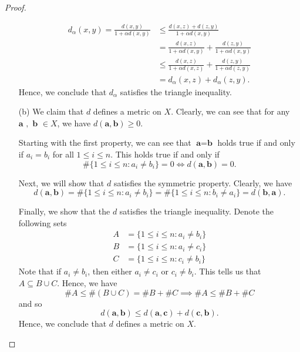 \documentclass[a4paper]{article}
\begin{document}
\begin{proof}
\begin{enumerate}
        \begin{align*}
            {d}_{\alpha}(x,y) = \frac{ d(x,y)  }{  1 + \alpha d(x,y) } &\leq \frac{ d(x,z) + d(z,y) }{ 1 + \alpha d(x,y) }    \\
                                                                       &= \frac{ d(x,z) }{  1 + \alpha d(x,y) } + \frac{ d(z,y) }{  1 + \alpha d(x,y) } \\
                                                                       &\leq \frac{ d(x,z) }{  1 + \alpha d(x,z) }  + \frac{ d(z,y)  }{  1 + \alpha d(z,y) } \\
                                                                       &= {d}_{\alpha}(x,z) + {d}_{\alpha}(z,y).
        \end{align*} 
Hence, we conclude that \( {d}_{\alpha}  \) satisfies the triangle inequality.
\item[(b)] We claim that \( d  \) defines a metric on \( X  \). Clearly, we can see that for any \( \textbf{a } , \textbf{ b }  \in X  \), we have \( d(\textbf{a},\textbf{b}) \geq 0  \).

    Starting with the first property, we can see that \( \textbf{a} = \textbf{b} \) holds true if and only if \( {a}_{i} = {b}_{i} \) for all \( 1 \leq i \leq n  \). This holds true if and only if  
    \[  \# \{  1 \leq i \leq n : {a}_{i} \neq {b}_{i} \}  = 0 \iff d(\textbf{a}, \textbf{b}) = 0.     \]
    
    Next, we will show that \( d  \) satisfies the symmetric property. Clearly, we have
    \[  d(\textbf{a}, \textbf{b}) = \# \{  1 \leq i \leq n : {a}_{i} \neq {b}_{i} \}  = \# \{  1 \leq i \leq n : {b}_{i} \neq {a}_{i} \}  = d(\textbf{b}, \textbf{a}). \]

    Finally, we show that the \( d   \) satisfies the triangle inequality. Denote the following sets
    \begin{align*}
        A &= \{  1 \leq i \leq n : {a}_{i} \neq {b}_{i} \}  \\
        B &= \{  1 \leq i \leq n : {a}_{i} \neq {c}_{i} \} \\
        C &= \{ 1 \leq i \leq n : {c}_{i} \neq {b}_{i}   \} 
    \end{align*}
    Note that if \( {a}_{i} \neq {b}_{i} \), then either \( {a}_{i} \neq {c}_{i}  \) or \( {c}_{i} \neq {b}_{i} \). This tells us that \( A \subseteq  B \cup C  \). Hence, we have    
    \[  \# A \leq \#(B \cup C ) = \# B + \# C \implies \# A \leq \# B + \# C     \]
    and so 
    \[  d(\textbf{a}, \textbf{b}) \leq d(\textbf{a}, \textbf{c}) + d(\textbf{c}, \textbf{b}). \]
    Hence, we conclude that \( d  \) defines a metric on \( X  \).

\end{enumerate}
\end{proof}
\end{document}
